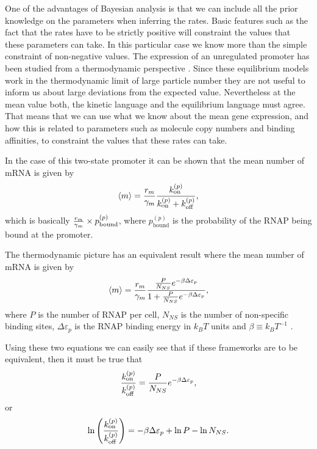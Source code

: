 One of the advantages of Bayesian analysis is that we can include all the prior
knowledge on the parameters when inferring the rates. Basic features such as the
fact that the rates have to be strictly positive will constraint the values that
these parameters can take. In this particular case we know more than the
simple constraint of non-negative values. The expression of an unregulated
promoter has been studied from a thermodynamic perspective \cite{Brewster2012}.
Since these equilibrium models work in the thermodynamic limit of large particle
number they are not useful to inform us about large deviations from the expected
value. Nevertheless at the mean value both, the kinetic language and the
equilibrium language must agree. That means that we can use what we know about
the mean gene expression, and how this is related to parameters such as molecule
copy numbers and binding affinities, to constraint the values that these rates
can take.

In the case of this two-state promoter it can be shown that the mean number of
mRNA is given by \cite{Phillips2015}
\begin{equation}
  \left\langle m \right\rangle = {r_m \over \gamma _m} {k^{(p)}_{\text{on}} \over k^{(p)}_{\text{on}} + k^{(p)}_{\text{off}}},
\end{equation}
which is basically ${r_m \over \gamma _m} \times p_{\text{bound}}^{(p)}$, where
$p_{\text{bound}}^{(p)}$ is the probability of the RNAP being bound at the
promoter.

The thermodynamic picture has an equivalent result where the mean number
of mRNA is given by \cite{Brewster2012, Bintu2005a}
\begin{equation}
  \left\langle m \right\rangle = {r_m \over \gamma _m}
  {{P \over N_{NS}} e^{-\beta\Delta\varepsilon_p} \over
  1 + {P \over N_{NS}} e^{-\beta\Delta\varepsilon_p}},
\end{equation}
where $P$ is the number of RNAP per cell, $N_{NS}$ is the number of non-specific
binding sites, $\Delta\varepsilon_p$ is the RNAP binding energy in $k_BT$ units
and $\beta\equiv {k_BT}^{-1}$ .

Using these two equations we can easily see that if these frameworks are to be
equivalent, then it must be true that
$$
{k^{(p)}_{\text{on}} \over k^{(p)}_{\text{off}}} = {P \over N_{NS}} e^{-\beta\Delta\varepsilon_p},
$$
or
$$
\ln \left({k^{(p)}_{\text{on}} \over k^{(p)}_{\text{off}}}\right) =
-\beta\Delta\varepsilon_p + \ln P - \ln N_{NS}.
$$

